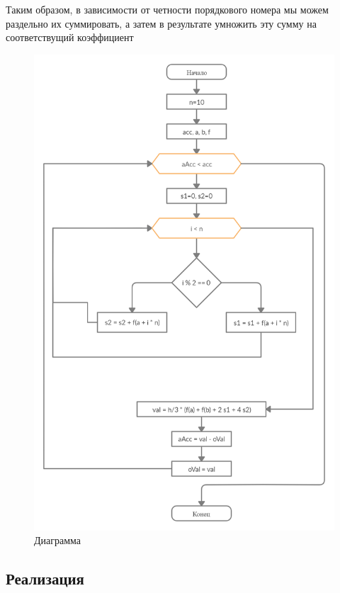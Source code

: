 \documentclass[11pt, english]{article}
\begin{document}
Таким образом, в зависимости от четности порядкового номера мы можем раздельно их суммировать, а затем в результате умножить эту сумму на соответствущий коэффициент
\newpage
\begin{center}
\begin{figure}[h!]
    \centering
    \includegraphics[width=12cm]{diagram.jpg}
    \caption{Диаграмма}
    \label{fig:my_label}
\end{figure}
\end{center}






\subsection{Реализация}
\end{document}
